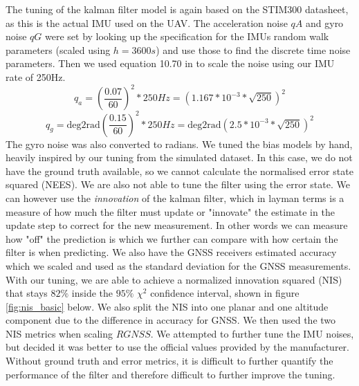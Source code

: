 The tuning of the kalman filter model is again based on the STIM300 datasheet, as this is the actual IMU used on the UAV. The acceleration noise $qA$ and gyro noise $qG$ were set by looking up the specification for the IMUs random walk parameters (scaled using $h=3600s$) and use those to find the discrete time noise parameters. Then we used equation 10.70 in \cite{edmund} to scale the noise using our IMU rate of 250Hz. 
\begin{equation}
q_a = (\frac{0.07}{60})^2 * 250Hz = (1.167*10^{-3}*\sqrt{250})^2
\end{equation}
\begin{equation}
q_g = \text{deg2rad}(\frac{0.15}{60})^2 * 250Hz = \text{deg2rad}(2.5*10^{-3}*\sqrt{250})^2
\end{equation}
The gyro noise was also converted to radians. We tuned the bias models by hand, heavily inspired by our tuning from the simulated dataset. In this case, we do not have the ground truth available, so we cannot calculate the normalised error state squared (NEES). We are also not able to tune the filter using the error state. We can however use the \textit{innovation} of the kalman filter, which in layman terms is a measure of how much the filter must update or "innovate" the estimate in the update step to correct for the new measurement. In other words we can measure how "off" the prediction is which we further can compare with how certain the filter is when predicting. We also have the GNSS receivers estimated accuracy which we scaled and used as the standard deviation for the GNSS measurements. With our tuning, we are able to achieve a normalized innovation squared (NIS) that stays $82\%$ inside the $95\%$ $\chi^2$ confidence interval, shown in figure \ref{fig:nis_basic} below. We also split the NIS into one planar and one altitude component due to the difference in accuracy for GNSS. We then used the two NIS metrics when scaling $RGNSS$. We attempted to further tune the IMU noises, but decided it was better to use the official values provided by the manufacturer. Without ground truth and error metrics, it is difficult to further quantify the performance of the filter and therefore difficult to further improve the tuning. 

